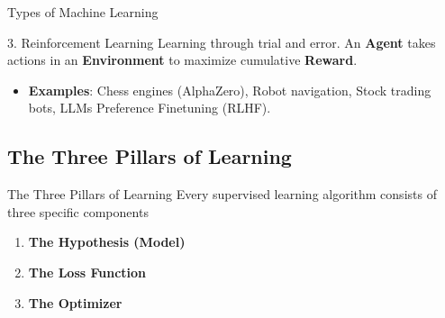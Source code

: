 \begin{frame}{Types of Machine Learning}
    \begin{block}{3. Reinforcement Learning}
        Learning through trial and error. An \textbf{Agent} takes actions in an \textbf{Environment} to maximize cumulative \textbf{Reward}.
    \end{block}
    \vspace{1em}

\centering
    
    \vspace{1em}
    \begin{itemize}
        \item \textbf{Examples}: Chess engines (AlphaZero), Robot navigation, Stock trading bots, LLMs Preference Finetuning (RLHF).
    \end{itemize}
\end{frame}

\subsection{The Three Pillars of Learning}

\begin{frame}{The Three Pillars of Learning}
    Every supervised learning algorithm consists of three specific components
    \vspace{1em}
    \begin{enumerate}
        \item \textbf{The Hypothesis (Model)}
        \item \textbf{The Loss Function}
        \item \textbf{The Optimizer}
    \end{enumerate}
    \vspace{1em}
    
\end{frame}


